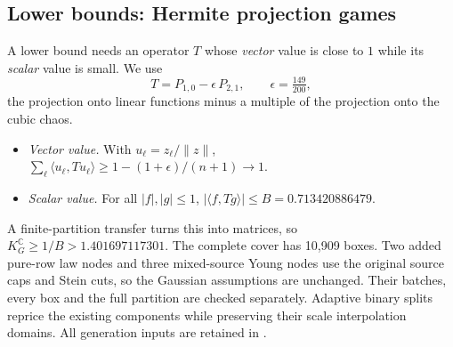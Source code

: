 \documentclass[11pt,a4paper]{article}
\newcommand{\C}{\mathbb{C}}
\newcommand{\KG}{K_G^{\C}}
\begin{document}
\subsection{Lower bounds: Hermite projection games}
A lower bound needs an operator $T$ whose \emph{vector} value is close to $1$ while its \emph{scalar} value is small. We use
\[
 T=P_{1,0}-\epsilon\,P_{2,1},\qquad \epsilon=\tfrac{149}{200},
\]
the projection onto linear functions minus a multiple of the projection onto the cubic chaos.
\begin{itemize}
\item \emph{Vector value.} With $u_\ell=z_\ell/\|z\|$, $\sum_\ell\langle u_\ell,Tu_\ell\rangle\ge1-(1+\epsilon)/(n+1)\to1$.
\item \emph{Scalar value.} For all $|f|,|g|\le1$, $|\langle f,Tg\rangle|\le B=0.713420886479$.
\end{itemize}
A finite-partition transfer turns this into matrices, so $\KG\ge1/B>1.401697117301$.
The complete cover has 10,909 boxes. Two added pure-row law nodes and three mixed-source Young nodes use the original source caps and
Stein cuts, so the Gaussian assumptions are unchanged. Their batches, every box and the full partition
are checked separately. Adaptive binary splits reprice the existing components while preserving
their scale interpolation domains. All generation inputs are retained in .
\end{document}
